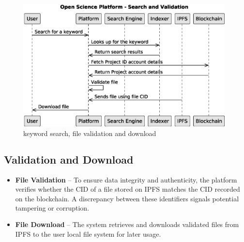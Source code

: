 \documentclass{article}
\begin{document}
\begin{figure}[htbp]
    \centering
    \includegraphics[width=0.98\textwidth, keepaspectratio]{c4_searching_and_validation.eps}
    \caption{keyword search, file validation and download}
    \label{fig:c4_keyword_search}
\end{figure}



\subsection{Validation and Download}

\begin{itemize}
    \item \textbf{File Validation} – To ensure data integrity and authenticity, the platform verifies whether the CID of a file stored on IPFS matches the CID recorded on the blockchain. A discrepancy between these identifiers signals potential tampering or corruption.

    \item \textbf{File Download} – The system retrieves and downloads validated files from IPFS to the user local file system for later usage.
\end{itemize}
\end{document}
